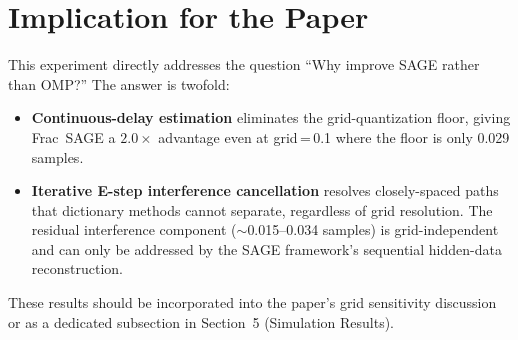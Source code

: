 \documentclass[11pt,a4paper]{article}
\begin{document}
\section{Implication for the Paper}

This experiment directly addresses the question ``Why improve SAGE rather than OMP?'' The answer is twofold:

\begin{itemize}
\item \textbf{Continuous-delay estimation} eliminates the grid-quantization floor, giving Frac~SAGE a $2.0\times$ advantage even at grid$\,$=$\,$0.1 where the floor is only 0.029 samples.
\item \textbf{Iterative E-step interference cancellation} resolves closely-spaced paths that dictionary methods cannot separate, regardless of grid resolution. The residual interference component ($\sim$0.015--0.034 samples) is grid-independent and can only be addressed by the SAGE framework's sequential hidden-data reconstruction.
\end{itemize}

These results should be incorporated into the paper's grid sensitivity discussion or as a dedicated subsection in Section~5 (Simulation Results).
\end{document}
